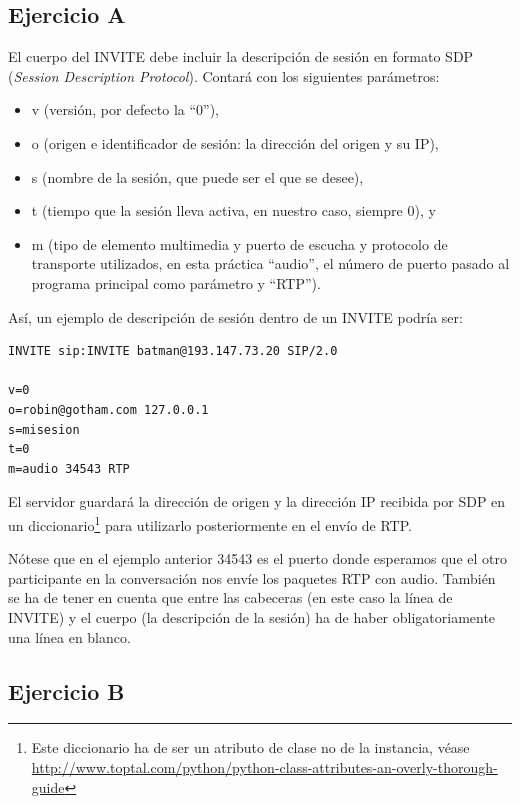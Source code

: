 \documentclass[a4paper,11pt]{article}
\begin{document}
\subsection*{Ejercicio A}

El cuerpo del INVITE debe incluir la descripción de sesión en formato SDP (\emph{Session Description Protocol}). Contará con los siguientes parámetros:

\begin{itemize}
  \item v (versión, por defecto la ``0''),
  \item o (origen e identificador de sesión: la dirección del origen y su IP),
  \item s (nombre de la sesión, que puede ser el que se desee),
  \item t (tiempo que la sesión lleva activa, en nuestro caso, siempre 0), y
  \item m (tipo de elemento multimedia y puerto de escucha y protocolo de transporte utilizados, en esta práctica ``audio'', el número de puerto pasado al programa principal como parámetro y ``RTP'').
\end{itemize}

Así, un ejemplo de descripción de sesión dentro de un INVITE podría ser:

\begin{verbatim}
INVITE sip:INVITE batman@193.147.73.20 SIP/2.0

v=0
o=robin@gotham.com 127.0.0.1
s=misesion
t=0
m=audio 34543 RTP
\end{verbatim}

El servidor guardará la dirección de origen y la dirección IP recibida por SDP en un diccionario\footnote{Este diccionario ha de ser un atributo de clase no de la instancia, véase \url{http://www.toptal.com/python/python-class-attributes-an-overly-thorough-guide}} para utilizarlo posteriormente en el envío de RTP.

Nótese que en el ejemplo anterior 34543 es el puerto donde esperamos que el otro participante en la conversación nos envíe los paquetes RTP con audio. También se ha de tener en cuenta que entre las cabeceras (en este caso la línea de INVITE) y el cuerpo (la descripción de la sesión) ha de haber obligatoriamente una línea en blanco.

\subsection*{Ejercicio B}
\end{document}
